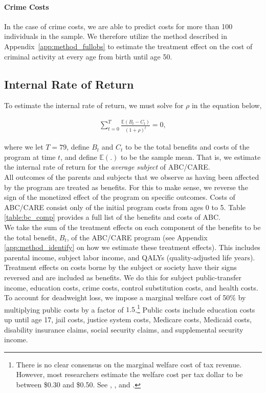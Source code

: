 \paragraph{Crime Costs}

\noindent In the case of crime costs, we are able to predict costs for more than 100 individuals in the
sample. We therefore utilize the method described in Appendix~\ref{app:method_fullobs}
to estimate the treatment effect on the cost of criminal activity at every age from birth until age 50. \\

\subsection{Internal Rate of Return}
\label{app:method_irr}

\noindent To estimate the internal rate of return, we must solve for $\rho$ in the equation below,

\begin{align}
\sum_{t=0}^T \frac{ \mathbb{E} (B_t - C_t)}{(1+\rho)^t} = 0,
\end{align}

\noindent where we let $T = 79$, define $B_t$ and $C_t$ to be the total benefits and costs of the program at time $t$, and define $\mathbb{E}(.)$ to be the sample mean. That is, we estimate the internal rate of return for the \textit{average subject} of ABC/CARE. \\

\noindent All outcomes of the parents and subjects that we observe as having been affected by the program are treated as benefits. For this to make sense, we reverse the sign of the monetized effect of the program on specific outcomes. Costs of ABC/CARE consist only of the initial program costs from ages 0 to 5. Table \ref{table:bc_comp} provides a full list of the benefits and costs of ABC. \\

\noindent We take the sum of the treatment effects on each component of the benefits to be the total benefit, $B_t$, of the ABC/CARE program (see Appendix \ref{app:method_identify} on how we estimate these treatment effects). This includes parental income, subject labor income, and QALYs (quality-adjusted life years). Treatment effects on costs borne by the subject or society have their signs reversed and are included as benefits. We do this for subject public-transfer income, education costs, crime costs, control substitution costs, and health costs. To account for deadweight loss, we impose a marginal welfare cost of 50\% by multiplying public costs by a factor of $1.5$.\footnote{There is no clear consensus on the marginal welfare cost of tax revenue. However, most researchers estimate the welfare cost per tax dollar to be between \$0.30 and \$0.50. See \citet{Feldstein_1999_REStat}, \citet{Heckman_Smith_1998_evaluating}, and \citet{Browning_1987_AER}.} Public costs include education costs up until age 17, jail costs, justice system costs, Medicare costs, Medicaid costs, disability insurance claims, social security claims, and supplemental security income. \\

